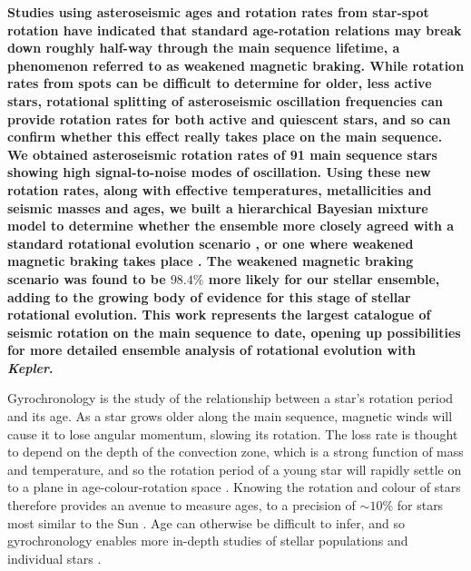 \documentclass[12pt]{article}
\begin{document}
\textbf{Studies using asteroseismic ages and rotation rates from star-spot rotation have indicated that standard age-rotation relations may break down roughly half-way through the main sequence lifetime, a phenomenon referred to as weakened magnetic braking. While rotation rates from spots can be difficult to determine for older, less active stars, rotational splitting of asteroseismic oscillation frequencies can provide rotation rates for both active and quiescent stars, and so can confirm whether this effect really takes place on the main sequence.\\
We obtained asteroseismic rotation rates of 91 main sequence stars showing high signal-to-noise modes of oscillation.
Using these new rotation rates, along with effective temperatures, metallicities and seismic masses and ages, we built a hierarchical Bayesian mixture model to determine whether the ensemble more closely agreed with a standard rotational evolution scenario \cite{vansaders+pinsonneault2013}, or one where weakened magnetic braking takes place \cite{vansaders+2016}. The weakened magnetic braking scenario was found to be $98.4\%$ more likely for our stellar ensemble, adding to the growing body of evidence for this stage of stellar rotational evolution. This work represents the largest catalogue of seismic rotation on the main sequence to date, opening up possibilities for more detailed ensemble analysis of rotational evolution with \textit{Kepler}.}

Gyrochronology is the study of the relationship between a star's rotation period and its age. As a star grows older along the main sequence, magnetic winds will cause it to lose angular momentum, slowing its rotation. The loss rate is thought to depend on the depth of the convection zone, which is a strong function of mass and temperature, and so the rotation period of a young star will rapidly settle on to a plane in age-colour-rotation space \cite{barnes2007}. Knowing the rotation and colour of stars therefore provides an avenue to measure ages, to a precision of $\sim 10\%$ for stars most similar to the Sun \cite{meibom+2015}. Age can otherwise be difficult to infer, and so gyrochronology enables more in-depth studies of stellar populations and individual stars \cite{leiner+2019,claytor+2019}.
\end{document}
